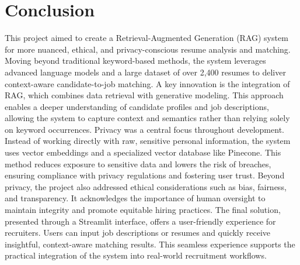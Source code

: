 \documentclass[12pt]{report}
\begin{document}
\section{Conclusion}
This project aimed to create a Retrieval-Augmented Generation (RAG) system for more nuanced, ethical, and privacy-conscious resume analysis and matching. Moving beyond traditional keyword-based methods, the system leverages advanced language models and a large dataset of over 2,400 resumes to deliver context-aware candidate-to-job matching. A key innovation is the integration of RAG, which combines data retrieval with generative modeling. This approach enables a deeper understanding of candidate profiles and job descriptions, allowing the system to capture context and semantics rather than relying solely on keyword occurrences. Privacy was a central focus throughout development. Instead of working directly with raw, sensitive personal information, the system uses vector embeddings and a specialized vector database like Pinecone. This method reduces exposure to sensitive data and lowers the risk of breaches, ensuring compliance with privacy regulations and fostering user trust. Beyond privacy, the project also addressed ethical considerations such as bias, fairness, and transparency. It acknowledges the importance of human oversight to maintain integrity and promote equitable hiring practices. The final solution, presented through a Streamlit interface, offers a user-friendly experience for recruiters. Users can input job descriptions or resumes and quickly receive insightful, context-aware matching results. This seamless experience supports the practical integration of the system into real-world recruitment workflows. 




\printbibliography
{}
\end{document}
